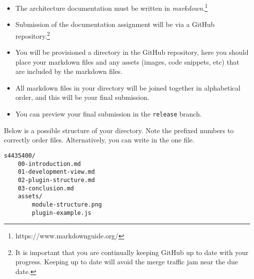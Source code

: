 \documentclass{csse4400}
\begin{document}
\begin{itemize}
    \item The architecture documentation must be written in \textsl{markdown}.\footnote{https://www.markdownguide.org/}
    \item Submission of the documentation assignment will be via a GitHub repository.\footnote{It is important that you are continually keeping GitHub up to date with your progress.
        Keeping up to date will avoid the merge traffic jam near the due date.}
    \item You will be provisioned a directory in the GitHub repository,
        here you should place your markdown files and any assets (images, code snippets, etc) that are included by the markdown files.
    \item All markdown files in your directory will be joined together in alphabetical order,
        and this will be your final submission.
    \item You can preview your final submission in the \texttt{release} branch.
\end{itemize}

Below is a possible structure of your directory. Note the prefixed numbers to correctly order files.
Alternatively, you can write in the one file.

\begin{verbatim}
s4435400/
    00-introduction.md
    01-development-view.md
    02-plugin-structure.md
    03-conclusion.md
    assets/
        module-structure.png
        plugin-example.js
\end{verbatim}
\end{document}
